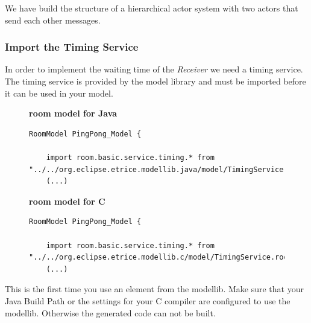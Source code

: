 We have build the structure of a hierarchical actor system with two actors that send each other messages.

\subsubsection*{Import the Timing Service}

In order to implement the waiting time of the \emph{Receiver} we need a timing service. The timing service is provided by the model library and must be imported before it can be used in your model.

\begin{figure}[ht]
\begin{minipage}[t]{0.50\linewidth}
\begin{mdframed}
	\textbf{room model for Java}
	\newline
\begin{lstlisting}[language=ROOM]
RoomModel PingPong_Model {

	import room.basic.service.timing.* from "../../org.eclipse.etrice.modellib.java/model/TimingService.room"
	(...)
\end{lstlisting}
\end{mdframed}
\end{minipage}
\hspace{0.1cm}
\begin{minipage}[t]{0.50\linewidth}
\begin{mdframed}
	\textbf{room model for C}
	\newline
\begin{lstlisting}[language=ROOM]
RoomModel PingPong_Model {

	import room.basic.service.timing.* from "../../org.eclipse.etrice.modellib.c/model/TimingService.room"
	(...)
\end{lstlisting}
\end{mdframed}
\end{minipage}
\end{figure}

This is the first time you use an element from the modellib. Make sure that your Java Build Path or the settings for your C compiler are configured to use the modellib. Otherwise the generated code can not be built.

